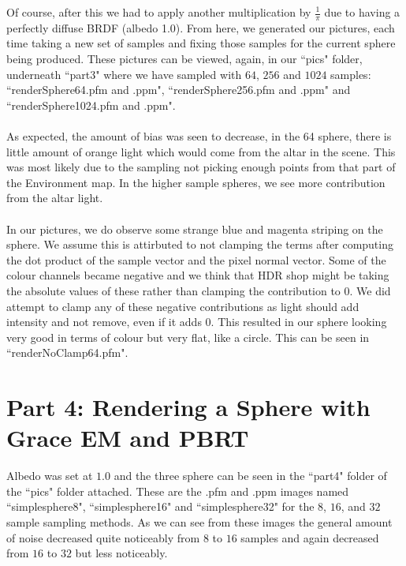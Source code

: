 \documentclass{article}
\begin{document}
Of course, after this we had to apply another multiplication
by $\frac{1}{\pi}$ due to having a perfectly diffuse BRDF (albedo 1.0). 
From here, we generated our pictures, each time
taking a new set of samples and fixing those samples for the 
current sphere being produced. These pictures can be viewed,
again, in our ``pics" folder, underneath ``part3" where we have
sampled with $64$, $256$ and $1024$ samples: 
``renderSphere64.pfm and .ppm", ``renderSphere256.pfm and .ppm" 
and ``renderSphere1024.pfm and .ppm". \\
\\
As expected, the amount of bias
was seen to decrease, in the 64 sphere, there is little amount of 
orange light which would come from the altar in the scene. This was
most likely due to the sampling not picking enough points from that part of
the Environment map. In the higher sample spheres, we see more contribution
from the altar light.\\
\\
In our pictures, we do observe some strange blue and magenta striping on the
sphere. We assume this is attirbuted to not clamping the terms after computing
the dot product of the sample vector and the pixel normal vector. Some of the
colour channels became negative and we think that HDR shop might be taking the
absolute values of these rather than clamping the contribution to $0$. We did
attempt to clamp any of these negative contributions as light should add intensity
and not remove, even if it adds 0. This resulted in our sphere looking very good in
terms of colour but very flat, like a circle. This can be seen in ``renderNoClamp64.pfm".
\section{Part 4: Rendering a Sphere with Grace EM and PBRT}
Albedo was set at $1.0$ and the three sphere can be seen in the
``part4" folder of the ``pics" folder attached. These are the
.pfm and .ppm images named ``simplesphere8", 
``simplesphere16" and ``simplesphere32" for the $8$, $16$, and
$32$ sample sampling methods.
As we can see from these images the general amount of noise 
decreased quite noticeably from $8$ to $16$ samples and again 
decreased from $16$ to $32$ but less noticeably.
\end{document}
